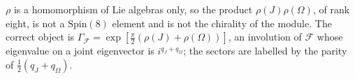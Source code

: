 \begin{remark}
$\rho$ is a homomorphism of Lie algebras only, so the product $\rho(J)\rho(\Omega)$, of rank eight, is not a $\mathrm{Spin}(8)$ element and
is not the chirality of the module. The correct object is $\Gamma_{\mathcal F}=\exp[\tfrac\pi2(\rho(J)+\rho(\Omega))]$, an involution of
$\mathcal F$ whose eigenvalue on a joint eigenvector is $i^{q_J+q_\Omega}$; the sectors are labelled by the parity of
$\tfrac12(q_J+q_\Omega)$.
\end{remark}

